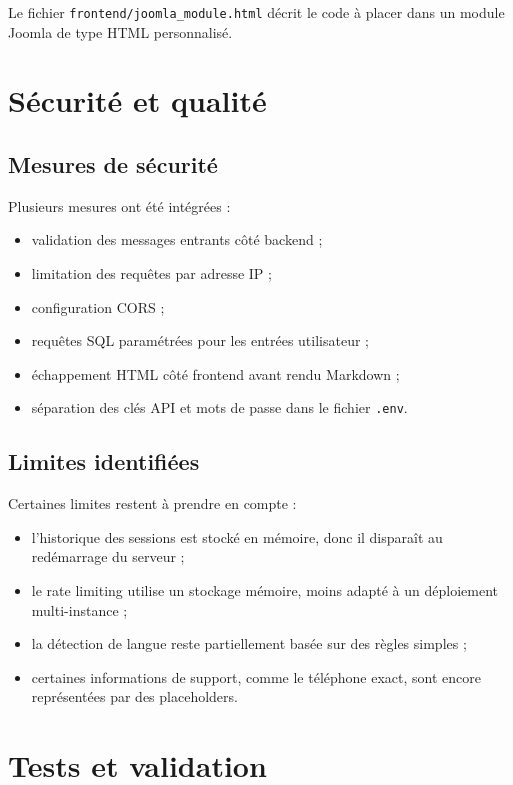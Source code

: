 \documentclass[12pt,a4paper]{report}
\begin{document}
Le fichier \texttt{frontend/joomla\_module.html} décrit le code à placer dans un module Joomla de type HTML personnalisé.

\chapter{Sécurité et qualité}

\section{Mesures de sécurité}

Plusieurs mesures ont été intégrées :

\begin{itemize}
    \item validation des messages entrants côté backend ;
    \item limitation des requêtes par adresse IP ;
    \item configuration CORS ;
    \item requêtes SQL paramétrées pour les entrées utilisateur ;
    \item échappement HTML côté frontend avant rendu Markdown ;
    \item séparation des clés API et mots de passe dans le fichier \texttt{.env}.
\end{itemize}

\section{Limites identifiées}

Certaines limites restent à prendre en compte :

\begin{itemize}
    \item l'historique des sessions est stocké en mémoire, donc il disparaît au redémarrage du serveur ;
    \item le rate limiting utilise un stockage mémoire, moins adapté à un déploiement multi-instance ;
    \item la détection de langue reste partiellement basée sur des règles simples ;
    \item certaines informations de support, comme le téléphone exact, sont encore représentées par des placeholders.
\end{itemize}

\chapter{Tests et validation}
\end{document}
